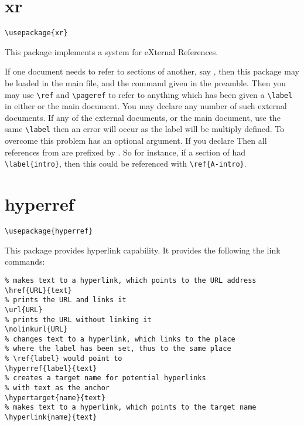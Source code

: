 \section{xr}
\label{sec:xr}
\begin{lstlisting}
\usepackage{xr}

\end{lstlisting}


This package implements a system for eXternal References.

If one document needs to refer to sections of another, say , then this package may be loaded in the main file, and the command \lstinline|| given in the preamble.
Then you may use \lstinline|\ref| and \lstinline|\pageref| to refer to anything which has been given a \lstinline|\label| in either  or the main document.
You may declare any number of such external documents.
If any of the external documents, or the main document, use the same \lstinline|\label| then an error will occur as the label will be multiply defined.
To overcome this problem \lstinline|| has an optional argument.
If you declare \lstinline|| Then all references from  are prefixed by .
So for instance, if a section of  had \lstinline|\label{intro}|, then this could be referenced with \lstinline|\ref{A-intro}|.


\section{hyperref}
\label{sec:hyperref}
\begin{lstlisting}
\usepackage{hyperref}
\end{lstlisting}

This package provides hyperlink capability. It provides the following the link commands:
\begin{lstlisting}
% makes text to a hyperlink, which points to the URL address
\href{URL}{text} 
% prints the URL and links it
\url{URL} 
% prints the URL without linking it
\nolinkurl{URL} 
% changes text to a hyperlink, which links to the place
% where the label has been set, thus to the same place 
% \ref{label} would point to
\hyperref{label}{text} 
% creates a target name for potential hyperlinks 
% with text as the anchor
\hypertarget{name}{text} 
% makes text to a hyperlink, which points to the target name
\hyperlink{name}{text} 
\end{lstlisting}


